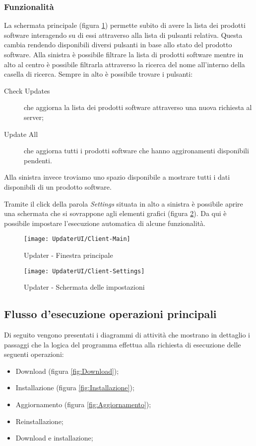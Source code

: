 \documentclass[../RelazioneFinale.tex]{subfiles}
\begin{document}
			\subsubsection{Funzionalità}
			La schermata principale (figura \ref{fig:Client-Main}) permette subito di avere la lista dei prodotti software interagendo su di essi attraverso alla lista di pulsanti relativa. Questa cambia rendendo disponibili diversi pulsanti in base allo stato del prodotto software.
			Alla sinistra è possibile filtrare la lista di prodotti software mentre in alto al centro è possibile filtrarla attraverso la ricerca del nome all'interno della casella di ricerca. Sempre in alto è possibile trovare i pulsanti:
			\begin{description}
				\item[Check Updates] che aggiorna la lista dei prodotti software attraverso una nuova richiesta al server;
				\item[Update All] che aggiorna tutti i prodotti software che hanno aggironamenti disponibili pendenti.
			\end{description}
			Alla sinistra invece troviamo uno spazio disponibile a mostrare tutti i dati disponibili di un prodotto software.
			
			
			Tramite il click della parola \emph{Settings} situata in alto a sinistra è possibile aprire una schermata che si sovrappone agli elementi grafici (figura \ref{fig:Client-Settings}). Da qui è possibile impostare l'esecuzione automatica di alcune funzionalità.

			\hspace{2cm}			
			
			\begin{figure}[h]
				\texttt{[image: UpdaterUI/Client-Main]}
				\caption{Updater - Finestra principale}
				\label{fig:Client-Main}
			\end{figure}
		
\newpage	
			
			\begin{figure}[h]
				\texttt{[image: UpdaterUI/Client-Settings]}
				\caption{Updater - Schermata delle impostazioni}
				\label{fig:Client-Settings}
			\end{figure}	

		\subsection{Flusso d'esecuzione operazioni principali}
		\label{subsec:operazioni}
			Di seguito vengono presentati i diagrammi di attività che mostrano in dettaglio i passaggi che la logica del programma effettua alla richiesta di esecuzione delle seguenti operazioni:
			\begin{itemize}
				\item Download (figura \ref{fig:Download});
				\item Installazione (figura \ref{fig:Installazione});
				\item Aggiornamento (figura \ref{fig:Aggiornamento});
				\item Reinstallazione;
				\item Download e installazione;
			\end{itemize}
			
\end{document}
